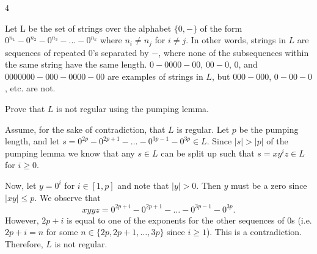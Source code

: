 \documentclass{article}
\newcommand{\set}[1]{\{#1\}}
\begin{document}
\begin{question}
    {4}
    {
        Let L be the set of strings over the alphabet $\{0, -\}$ of the form $0^{n_1}-0^{n_2}-0^{n_3}-...-0^{n_k}$ where $n_i \neq n_j$ for $i \neq j$. In other words, strings in $L$ are sequences of repeated 0's separated by $-$, where none of the subsequences within the same string have the same length. $0-0000-00$, $00-0$, $0$, and $0000000-000-0000-00$ are examples of strings in $L$, but $000-000$, $0-00-0$, etc. are not.

        Prove that $L$ is not regular using the pumping lemma.
    }
    Assume, for the sake of contradiction, that $L$ is regular. Let $p$ be the
    pumping length, and let $s = 0^{2p}-0^{2p+1}-\dots-0^{3p-1}-0^{3p} \in L$.
    Since $|s| > |p|$ of the pumping lemma we know that any $s \in L$ can
    be split up such that $s = xy^iz \in L$ for $i \geq 0$.

    Now, let $y = 0^i$ for $i \in [1, p]$ and note that $|y| > 0$. Then $y$ must be a zero since $|xy| \leq p$.
    We observe that
    \begin{equation*}
        xyyz = 0^{2p+i}-0^{2p+1}-\dots-0^{3p-1}-0^{3p}.
    \end{equation*}
    However, $2p+i$ is equal to one of the exponents for the other sequences of 0s
    (i.e. $2p + i = n$ for some $n \in \set{2p, 2p + 1,\dots,3p}$ since $i \geq 1$).
    This is a contradiction. Therefore, $L$ is not regular.

\end{question}
\end{document}
